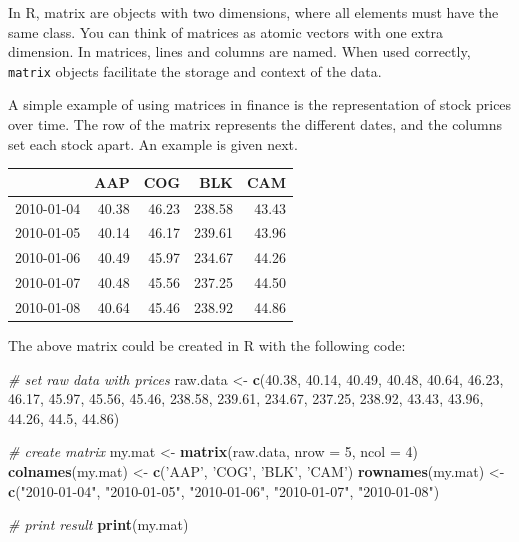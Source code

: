\documentclass[11pt,]{book}
\newenvironment{Shaded}{\begin{snugshade}}{\end{snugshade}}
\newcommand{\KeywordTok}[1]{\textcolor[rgb]{0.27,0.27,0.27}{\textbf{#1}}}
\newcommand{\DataTypeTok}[1]{\textcolor[rgb]{0.27,0.27,0.27}{#1}}
\newcommand{\DecValTok}[1]{\textcolor[rgb]{0.06,0.06,0.06}{#1}}
\newcommand{\FloatTok}[1]{\textcolor[rgb]{0.06,0.06,0.06}{#1}}
\newcommand{\StringTok}[1]{\textcolor[rgb]{0.5,0.5,0.5}{#1}}
\newcommand{\CommentTok}[1]{\textcolor[rgb]{0.56,0.35,0.01}{\textit{#1}}}
\newcommand{\NormalTok}[1]{#1}
\begin{document}
In R, matrix are objects with two dimensions, where all elements must
have the same class. You can think of matrices as atomic vectors with
one extra dimension. In matrices, lines and columns are named. When used
correctly, \texttt{matrix} objects facilitate the storage and context of
the data. 

A simple example of using matrices in finance is the representation of
stock prices over time. The row of the matrix represents the different
dates, and the columns set each stock apart. An example is given next.

\begin{longtable}[]{@{}lrrrr@{}}
\toprule
& AAP & COG & BLK & CAM\tabularnewline
\midrule
\endhead
2010-01-04 & 40.38 & 46.23 & 238.58 & 43.43\tabularnewline
2010-01-05 & 40.14 & 46.17 & 239.61 & 43.96\tabularnewline
2010-01-06 & 40.49 & 45.97 & 234.67 & 44.26\tabularnewline
2010-01-07 & 40.48 & 45.56 & 237.25 & 44.50\tabularnewline
2010-01-08 & 40.64 & 45.46 & 238.92 & 44.86\tabularnewline
\bottomrule
\end{longtable}

The above matrix could be created in R with the following code:

\begin{Shaded}
\begin{Highlighting}[]
\CommentTok{# set raw data with prices }
\NormalTok{raw.data <-}\StringTok{ }\KeywordTok{c}\NormalTok{(}\FloatTok{40.38}\NormalTok{,  }\FloatTok{40.14}\NormalTok{,  }\FloatTok{40.49}\NormalTok{,  }\FloatTok{40.48}\NormalTok{,  }\FloatTok{40.64}\NormalTok{,}
              \FloatTok{46.23}\NormalTok{,  }\FloatTok{46.17}\NormalTok{,  }\FloatTok{45.97}\NormalTok{,  }\FloatTok{45.56}\NormalTok{,  }\FloatTok{45.46}\NormalTok{,}
              \FloatTok{238.58}\NormalTok{, }\FloatTok{239.61}\NormalTok{, }\FloatTok{234.67}\NormalTok{, }\FloatTok{237.25}\NormalTok{, }\FloatTok{238.92}\NormalTok{,}
              \FloatTok{43.43}\NormalTok{,  }\FloatTok{43.96}\NormalTok{,  }\FloatTok{44.26}\NormalTok{,  }\FloatTok{44.5}\NormalTok{,   }\FloatTok{44.86}\NormalTok{)}

\CommentTok{# create matrix          }
\NormalTok{my.mat <-}\StringTok{ }\KeywordTok{matrix}\NormalTok{(raw.data, }\DataTypeTok{nrow =} \DecValTok{5}\NormalTok{, }\DataTypeTok{ncol =} \DecValTok{4}\NormalTok{)}
\KeywordTok{colnames}\NormalTok{(my.mat) <-}\StringTok{ }\KeywordTok{c}\NormalTok{(}\StringTok{'AAP'}\NormalTok{, }\StringTok{'COG'}\NormalTok{, }\StringTok{'BLK'}\NormalTok{, }\StringTok{'CAM'}\NormalTok{)}
\KeywordTok{rownames}\NormalTok{(my.mat) <-}\StringTok{ }\KeywordTok{c}\NormalTok{(}\StringTok{"2010-01-04"}\NormalTok{, }\StringTok{"2010-01-05"}\NormalTok{, }\StringTok{"2010-01-06"}\NormalTok{, }
                      \StringTok{"2010-01-07"}\NormalTok{, }\StringTok{"2010-01-08"}\NormalTok{)}

\CommentTok{# print result}
\KeywordTok{print}\NormalTok{(my.mat)}
\end{Highlighting}
\end{Shaded}
\end{document}
